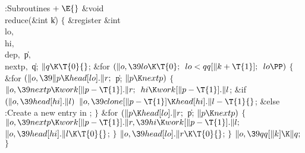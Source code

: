 \Y\B\4:Subroutines\X${}\mathrel+\E{}$\6
\&{void} \\{reduce}(\&{int} \|k)\1\1\2\2\6
${}\{{}$\1\6
\&{register} \&{int} \\{lo}${},{}$ \\{hi}${},{}$ \\{dep}${},{}$ \|p${},{}$ %
\\{nextp}${},{}$ \|q;\7
${}\|q\K\T{0}{}$;\6
\&{for} ${}(\|o,\39\\{lo}\K\T{0};{}$ ${}\\{lo}<\\{qq}[\|k+\T{1}];{}$ ${}\\{lo}%
\PP){}$\5
${}\{{}$\1\6
\&{for} ${}(\|o,\39\|p\K\\{head}[\\{lo}].\|r;{}$ \|p; ${}\|p\K\\{nextp}){}$\5
${}\{{}$\1\6
${}\|o,\39\\{nextp}\K\\{work}[\|p-\T{1}].\|r;{}$\6
${}\\{hi}\K\\{work}[\|p-\T{1}].\|l{}$;\6
\&{if} ${}(\|o,\39\\{head}[\\{hi}].\|l){}$\1\5
${}\|o,\39\\{clone}[\|p-\T{1}]\K\\{head}[\\{hi}].\|l-\T{1}{}$;\2\6
\&{else}\1\5
:Create a new entry in \X;\2\6
\4${}\}{}$\2\6
\&{for} ${}(\|p\K\\{head}[\\{lo}].\|r;{}$ \|p; ${}\|p\K\\{nextp}){}$\5
${}\{{}$\1\6
${}\|o,\39\\{nextp}\K\\{work}[\|p-\T{1}].\|r,\39\\{hi}\K\\{work}[\|p-\T{1}].%
\|l;{}$\6
${}\|o,\39\\{head}[\\{hi}].\|l\K\T{0}{}$;\6
\4${}\}{}$\2\6
${}\|o,\39\\{head}[\\{lo}].\|r\K\T{0}{}$;\6
\4${}\}{}$\2\6
${}\|o,\39\\{qq}[\|k]\K\|q;{}$\6
\4${}\}{}$\2\par
\fi


